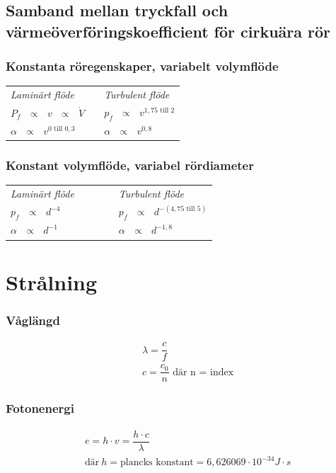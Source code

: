   \subsection*{Samband mellan tryckfall och värmeöverföringskoefficient för cirkuära rör}
\subsubsection*{Konstanta röregenskaper, variabelt volymflöde}
\begin{tabularx}{\linewidth} { l l l}
	\textit{Laminärt flöde} &   & \textit{Turbulent flöde} \\ 
  $P_f \text{ } \propto \text{ } v \text{ } \propto \text{ } \dot{V}$ &&  $p_f \text{ } \propto \text{ } v^{1,75 \text{ till } 2}$\\
  $\alpha \text{ } \propto \text{ } v^{0 \text{ till } 0,3}$ &&  $\alpha \text{ } \propto \text{ } v^{0,8}$\\
	\end{tabularx}
\subsubsection*{Konstant volymflöde, variabel rördiameter}
\begin{tabularx}{\linewidth} {l l l} 
	\textit{Laminärt flöde} & ~~~~~  & \textit{Turbulent flöde} \\ 
	$p_f \text{ } \propto \text{ } d^{-4}$ && $p_f \text{ } \propto \text{ } d^{-(4,75 \text{ till } 5)}$\\
		$\alpha \text{ } \propto \text{ } d^{-1}$ && $\alpha \text{ } \propto \text{ } d^{-1,8}$\\
		\end{tabularx}
\section*{Strålning}
\subsubsection*{Våglängd}
\begin{align*}
	&\lambda = \dfrac{c}{f} \\
	& c = \dfrac{c_{0}}{n} \text{ där n = index}
\end{align*}
\subsubsection*{Fotonenergi}
\begin{align*}
	& e = h \cdot v = \dfrac{h \cdot c}{\lambda}\\
	& \text{där} \ h = \text{plancks konstant} = 6,626069 \cdot 10^{-34} J \cdot s
\end{align*}
